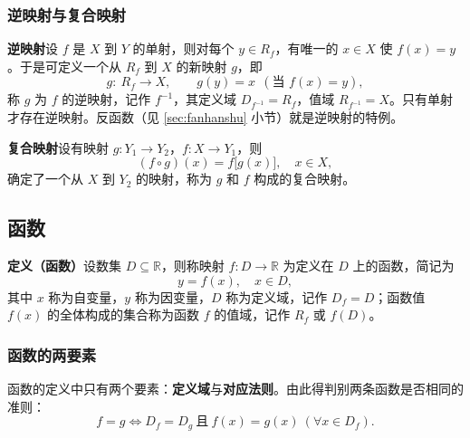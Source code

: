 \subsubsection{逆映射与复合映射}
\textbf{逆映射}\quad 设 $f$ 是 $X$ 到 $Y$ 的单射，则对每个 $y\in R_f$，有唯一的 $x\in X$ 使 $f(x)=y$。于是可定义一个从 $R_f$ 到 $X$ 的新映射 $g$，即
\[
g:\ R_f\to X,\qquad g(y)=x\ \ (\text{当 }f(x)=y),
\]
称 $g$ 为 $f$ 的逆映射，记作 $f^{-1}$，其定义域 $D_{f^{-1}}=R_f$，值域 $R_{f^{-1}}=X$。只有单射才存在逆映射。反函数（见 \ref{sec:fanhanshu} 小节）就是逆映射的特例。

\textbf{复合映射}\quad 设有映射 $g:Y_1\to Y_2$，$f:X\to Y_1$，则
\[
(f\circ g)(x)=f\bigl[g(x)\bigr],\quad x\in X,
\]
确定了一个从 $X$ 到 $Y_2$ 的映射，称为 $g$ 和 $f$ 构成的复合映射。


\subsection{函数}

\textbf{定义（函数）}\quad 设数集 $D\subseteq\mathbb{R}$，则称映射 $f:D\to\mathbb{R}$ 为定义在 $D$ 上的函数，简记为
\[
y=f(x),\quad x\in D ,
\]
其中 $x$ 称为自变量，$y$ 称为因变量，$D$ 称为定义域，记作 $D_f=D$；函数值 $f(x)$ 的全体构成的集合称为函数 $f$ 的值域，记作 $R_f$ 或 $f(D)$。

\subsubsection{函数的两要素}
函数的定义中只有两个要素：\textbf{定义域}与\textbf{对应法则}。由此得判别两条函数是否相同的准则：
\begin{equation}
f=g\iff D_f=D_g\ \text{且}\ f(x)=g(x)\ (\forall x\in D_f).
\end{equation}


